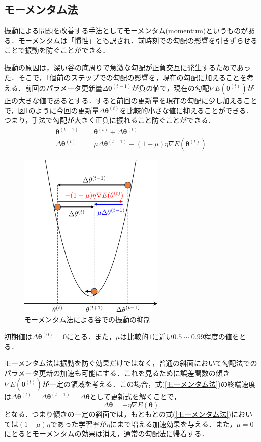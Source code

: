 \documentclass[a4paper,11pt]{jsreport}
\begin{document}
\subsection{モーメンタム法}
振動による問題を改善する手法としてモーメンタム(momentum)というものがある．モーメンタムは「慣性」とも訳され．前時刻での勾配の影響を引きずらせることで振動を防ぐことができる．\par
振動の原因は，深い谷の底周りで急激な勾配が正負交互に発生するためであった．そこで，1個前のステップでの勾配の影響を，現在の勾配に加えることを考える．前回のパラメータ更新量$\Delta \bm{\theta}^{(t-1)}$が負の値で，現在の勾配$\nabla E(\bm{\theta}^{(t)})$が正の大きな値であるとする．すると前回の更新量を現在の勾配に少し加えることで，図\ref{モーメンタム法による勾配抑制図}のように今回の更新量$\Delta \bm{\theta}^{(t)}$を比較的小さな値に抑えることができる．つまり，手法で勾配が大きく正負に振れること防ぐことができる．
\begin{align}
  \bm{\theta}^{(t+1)}
   & = \bm{\theta}^{(t)} + \Delta \bm{\theta}^{(t)}                              \\
  \Delta \bm{\theta}^{(t)}
   & = \mu \Delta \bm{\theta}^{(t-1)} - (1-\mu) \eta \nabla E(\bm{\theta}^{(t)}) \label{モーメンタム法}
\end{align}
\begin{figure}
  \begin{center}
    \includegraphics[height=8cm]{image/モーメンタム法.png}
    \caption{モーメンタム法による谷での振動の抑制}
    \label{モーメンタム法による勾配抑制図}
  \end{center}
\end{figure}
初期値は$\Delta \bm{\theta}^{(0)} = 0$にとる．また，$\mu$は比較的$1$に近い$0.5 \sim 0.99$程度の値をとる．\par
モーメンタム法は振動を防ぐ効果だけではなく，普通の斜面において勾配法でのパラメータ更新の加速も可能にする．これを見るために誤差関数の傾き$\nabla E(\bm{\theta}^{(t)})$が一定の領域を考える．この場合，式(\ref{モーメンタム法})の終端速度は$\Delta \bm{\theta}^{(t)} = \Delta \bm{\theta}^{(t+1)} = \Delta \bm{\theta}$として更新式を解くことで，
\begin{equation}
  \Delta \bm{\theta} = -\eta \nabla E(\bm{\theta})
\end{equation}
となる．つまり傾きの一定の斜面では，もともとの式(\ref{モーメンタム法})においては$(1-\mu)\eta$であった学習率が$\eta$にまで増える加速効果を与える．また，$\mu=0$にとるとモーメンタムの効果は消え，通常の勾配法に帰着する．
\end{document}

